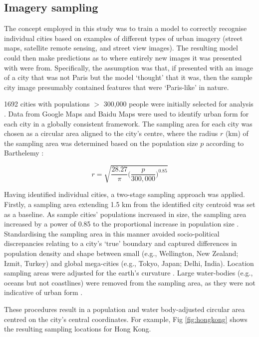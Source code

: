 \documentclass[10pt,letterpaper]{article}
\begin{document}
\subsection*{Imagery sampling}\label{sec:methods2}

The concept employed in this study was to train a model to correctly recognise individual cities based on examples of different types of urban imagery (street maps, satellite remote sensing, and street view images). The resulting model could then make predictions as to where entirely new images it was presented with were from. Specifically, the assumption was that, if presented with an image of a city that was not Paris but the model `thought' that it was, then the sample city image presumably contained features that were `Paris-like' in nature. 

1692 cities with populations $>$ 300,000 people were initially selected for analysis \cite{UN2014}. Data from Google Maps and Baidu Maps were used to identify urban form for each city in a globally consistent framework. The sampling area for each city was chosen as a circular area aligned to the city's centre, where the radius $r$ (km) of the sampling area was determined based on the population size $p$ according to Barthelemy \cite{Barthelemy2016}: 

\begin{equation}
r = \sqrt{ \frac{28.27}{\pi} \bigg( \frac{p}{300,000}  \bigg)^{0.85} }
\end{equation}

Having identified individual cities, a two-stage sampling approach was applied. Firstly, a sampling area extending 1.5 km from the identified city centroid \cite{UN2014} was set as a baseline. As sample cities' populations increased in size, the sampling area increased by a power of 0.85 to the proportional increase in population size \cite{Barthelemy2016}. Standardising the sampling area in this manner avoided socio-political discrepancies relating to a city's `true' boundary and captured differences in population density and shape between small (e.g., Wellington, New Zealand; Izmit, Turkey) and global mega-cities (e.g., Tokyo, Japan;  Delhi, India). Location sampling areas were adjusted for the earth's curvature \cite{Sinnott1984}. Large water-bodies (e.g., oceans but not coastlines) were removed from the sampling area, as they were not indicative of urban form . 

These procedures result in a population and water body-adjusted circular area centred on the city's central coordinates. For example, Fig \ref{fig:hongkong} shows the resulting sampling locations for Hong Kong.
\end{document}
